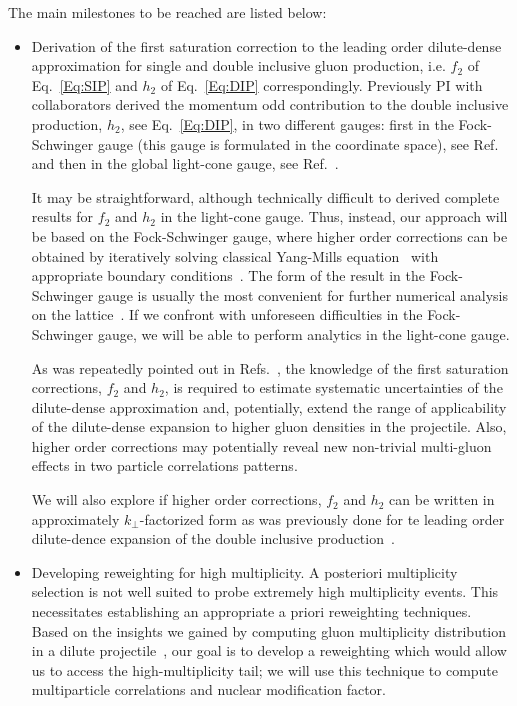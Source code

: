		The main milestones to be reached are listed below:
		\begin{itemize}
			\item Derivation of the first saturation correction to the leading order 
				dilute-dense approximation for single and double 
				inclusive gluon production, i.e. $f_2$ of Eq.~\eqref{Eq:SIP} and $h_2$  of Eq.~\eqref{Eq:DIP} correspondingly. 
				Previously PI with collaborators
				derived the momentum odd contribution to the double inclusive production, $h_2$, see Eq.~\eqref{Eq:DIP}, 
				in two different gauges: first in  the Fock-Schwinger gauge (this gauge is formulated in the coordinate space), see Ref.~\cite{McLerran:2016snu} and 
				then in the global light-cone gauge, see Ref.~\cite{Kovchegov:2018jun}.


				It may be straightforward, although technically difficult to derived complete 
				results for  $f_2$ and $h_2$ in the light-cone gauge. Thus, instead, 
				our approach will be based on the Fock-Schwinger gauge, where higher order corrections 
				can be obtained by iteratively solving classical Yang-Mills equation~\cite{Dumitru:2001ux,McLerran:2016snu}
				with appropriate boundary conditions~\cite{Kovner:1995ts}.
				The form of the result in the Fock-Schwinger gauge is usually the most convenient for 
				further numerical analysis on the lattice~\cite{Kovchegov:2018jun}.
				If we confront with unforeseen difficulties in the Fock-Schwinger gauge,
				we will be able to perform analytics in the light-cone gauge.  


				As was repeatedly pointed out  in Refs.~\cite{Mace:2018vwq,Mace:2018yvl}, the knowledge of the first saturation corrections, 
				$f_2$ and $h_2$, is required to estimate systematic uncertainties of the dilute-dense 
				approximation and, potentially, extend the range of applicability of the dilute-dense expansion to higher 
				gluon densities in the projectile. Also, higher order corrections may potentially reveal new non-trivial multi-gluon
				effects in two particle correlations patterns.  
			
				We will also  explore if higher order corrections, $f_2$ and $h_2$ can be written in approximately 
				$k_\perp$-factorized form as was previously done for te leading order dilute-dence expansion 
				of the double inclusive production~\cite{Kovchegov:2013ewa}.

			\item Developing reweighting  for high multiplicity.  A posteriori multiplicity 
				selection is not well suited to probe extremely high multiplicity events. This necessitates 
				establishing an appropriate a priori reweighting
				techniques. Based on the insights we gained by computing gluon multiplicity distribution
				in a dilute  projectile~\cite{Dumitru:2017cwt,Dumitru:2017ftq,Dumitru:2018iko}, our  goal 
				is to  develop a reweighting which would  allow us to access the
				high-multiplicity tail; we will use this technique to compute multiparticle correlations
				and nuclear modification factor.  


\end{itemize}
